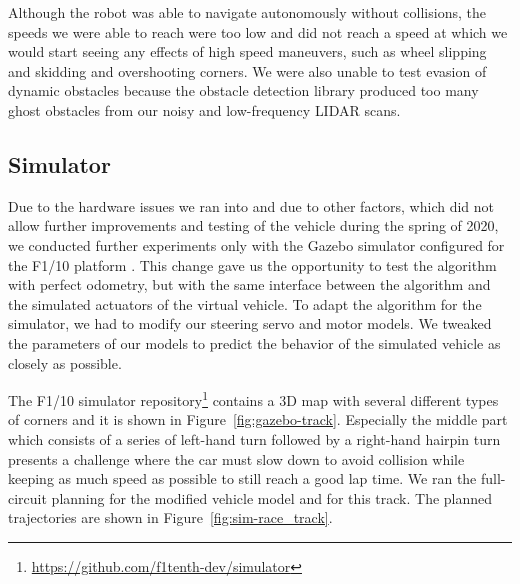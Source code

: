 Although the robot was able to navigate autonomously without collisions, the speeds we were able to reach were too low and did not reach a speed at which we would start seeing any effects of high speed maneuvers, such as wheel slipping and skidding and overshooting corners. We were also unable to test evasion of dynamic obstacles because the obstacle detection library produced too many ghost obstacles from our noisy and low-frequency \gls*{LIDAR} scans.

\subsection{Simulator}
Due to the hardware issues we ran into and due to other factors, which did not allow further improvements and testing of the vehicle during the spring of 2020, we conducted further experiments only with the Gazebo simulator \cite{gazebo} configured for the F1/10 platform \cite{varundev_ros_19}. This change gave us the opportunity to test the algorithm with perfect odometry, but with the same interface between the algorithm and the simulated actuators of the virtual vehicle. To adapt the algorithm for the simulator, we had to modify our steering servo and motor models. We tweaked the parameters of our models to predict the behavior of the simulated vehicle as closely as possible.

The F1/10 simulator repository\footnote{\url{https://github.com/f1tenth-dev/simulator}} contains a 3D map with several different types of corners and it is shown in Figure~\ref{fig:gazebo-track}. Especially the middle part which consists of a series of left-hand turn followed by a right-hand hairpin turn presents a challenge where the car must slow down to avoid collision while keeping as much speed as possible to still reach a good lap time. We ran the full-circuit planning for the modified vehicle model and for this track. The planned trajectories are shown in Figure~\ref{fig:sim-race_track}.


